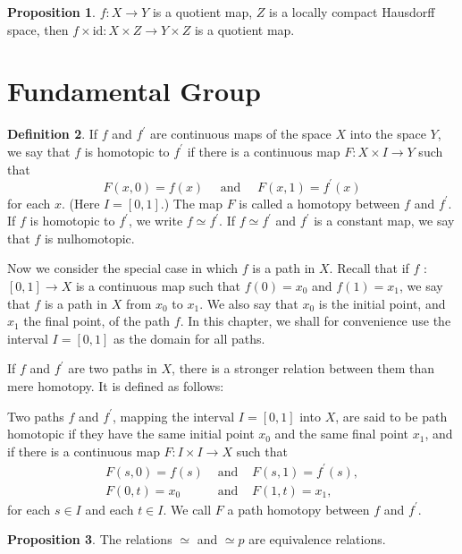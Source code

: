 \documentclass[12pt,a4paper]{book}
\theoremstyle{definition}
\newtheorem{defn}{Definition}[section]
\newtheorem{prop}[defn]{Proposition}
\begin{document}
\begin{prop}
    $f:X\rightarrow Y$ is a quotient map, $Z$ is a locally compact Hausdorff space, then $f\times \text{id}:X\times Z\rightarrow Y\times Z$ is a quotient map.
    \label{proposition:quotient map,product}
\end{prop}


\newpage
\section{Fundamental Group}
\begin{defn}
    If $f$ and $f^{\prime}$ are continuous maps of the space $X$ into the space $Y$, we say that $f$ is homotopic to $f^{\prime}$ if there is a continuous map $F: X \times I \rightarrow Y$ such that
    $$
        F(x, 0)=f(x) \quad \text { and } \quad F(x, 1)=f^{\prime}(x)
    $$
    for each $x$. (Here $I=[0,1]$.) The map $F$ is called a homotopy between $f$ and $f^{\prime}$. If $f$ is homotopic to $f^{\prime}$, we write $f \simeq f^{\prime}$. If $f \simeq f^{\prime}$ and $f^{\prime}$ is a constant map, we say that $f$ is nulhomotopic.

    Now we consider the special case in which $f$ is a path in $X$. Recall that if $f$ : $[0,1] \rightarrow X$ is a continuous map such that $f(0)=x_0$ and $f(1)=x_1$, we say that $f$ is a path in $X$ from $x_0$ to $x_1$. We also say that $x_0$ is the initial point, and $x_1$ the final point, of the path $f$. In this chapter, we shall for convenience use the interval $I=[0,1]$ as the domain for all paths.

    If $f$ and $f^{\prime}$ are two paths in $X$, there is a stronger relation between them than mere homotopy. It is defined as follows:

    Two paths $f$ and $f^{\prime}$, mapping the interval $I=[0,1]$ into $X$, are said to be path homotopic if they have the same initial point $x_0$ and the same final point $x_1$, and if there is a continuous map $F: I \times I \rightarrow X$ such that
    $$
        \begin{array}{lll}
            F(s, 0)=f(s) & \text { and } & F(s, 1)=f^{\prime}(s), \\
            F(0, t)=x_0  & \text { and } & F(1, t)=x_1,
        \end{array}
    $$
    for each $s \in I$ and each $t \in I$. We call $F$ a path homotopy between $f$ and $f^{\prime}$.
\end{defn}
\begin{prop}
    The relations $\simeq$ and $\simeq p$ are equivalence relations.
\end{prop}
\end{document}
